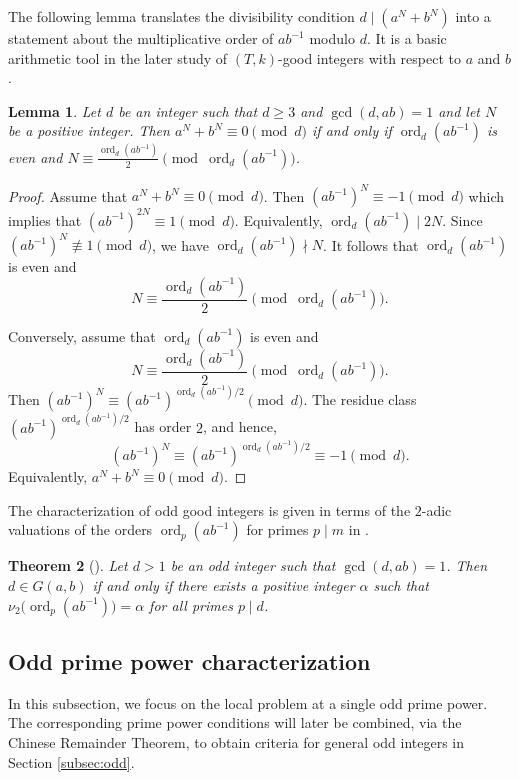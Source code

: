 \documentclass[pdflatex,sn-mathphys-num]{sn-jnl}%
\theoremstyle{thmstyleone}%
\newtheorem{theorem}{Theorem}%
\newtheorem{lemma}[theorem]{Lemma}%
\theoremstyle{thmstyletwo}%
\theoremstyle{thmstylethree}%
\newcommand{\ord}{\operatorname{ord}}
\begin{document}
The following lemma translates the divisibility condition $d\mid (a^N+b^N)$ into a statement about the multiplicative order of $ab^{-1}$ modulo $d$. It is a basic arithmetic tool in the later study of $(T,k)$-good integers   with respect to $a$ and $b$.

\begin{lemma}\label{lem:minusone}
Let $d$ be an integer such that  $d\geq 3$ and  $\gcd(d,ab)=1$ and let $N$ be a positive integer.  Then  $
a^N+b^N\equiv 0\pmod d $
  if and only if $\ord_d(a b^{-1})$ is even and $
N\equiv \frac{\ord_d(a b^{-1})}{2}\pmod {\ord_d(a b^{-1})}$.
\end{lemma}

 \begin{proof}
 Assume that 
$
a^N+b^N\equiv 0\pmod d$.  Then  $
(ab^{-1})^N\equiv -1\pmod d$ which implies that $
(ab^{-1})^{2N}\equiv 1\pmod d$. 
Equivalently, 
$\ord_d(ab^{-1})\mid 2N$.
Since
$
(ab^{-1})^N\not\equiv 1\pmod d$,
we have 
$
\ord_d(ab^{-1})\nmid N$.
It follows that $\ord_d(ab^{-1})$ is even and
\[
N\equiv \frac{\ord_d(ab^{-1})}{2}\pmod{\ord_d(ab^{-1})}.
\]

Conversely, assume that $\ord_d(ab^{-1})$ is even and
\[
N\equiv \frac{\ord_d(ab^{-1})}{2}\pmod{\ord_d(ab^{-1})}.
\]
Then $
(ab^{-1})^N\equiv (ab^{-1})^{\ord_d(ab^{-1})/2}\pmod d$.
The residue class
$
(ab^{-1})^{\ord_d(ab^{-1})/2}$
has order $2$, and hence,
\[
(ab^{-1})^N\equiv(ab^{-1})^{\ord_d(ab^{-1})/2}\equiv -1\pmod d.
\]
Equivalently, 
$
a^N+b^N\equiv 0\pmod d$.
\end{proof}

The  characterization of odd  good integers is given  in terms of the $2$-adic valuations of the orders $\ord_p(a b^{-1})$ for primes $p\mid m$ in \cite{Moree1997}.    

\begin{theorem}[{\cite[Theorem 1]{Moree1997}}]\label{cor:minusone-odd}
Let $d>1$ be an odd integer such that $\gcd(d,ab)=1$. Then
$
d\in G(a,b)$
if and only if there exists a positive integer $\alpha$ such that
$
\nu_2\bigl(\ord_p(a b^{-1})\bigr)=\alpha $
for all primes $ p\mid d$.
\end{theorem}

 


 
 




\subsection{Odd prime power characterization}
In this subsection, we focus on the local problem at a single odd prime power. The corresponding prime power conditions will later be combined, via the Chinese Remainder Theorem, to obtain criteria for general odd integers in Section \ref{subsec:odd}.
\end{document}
